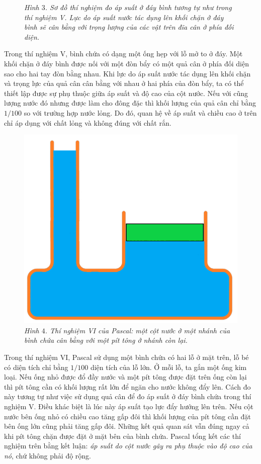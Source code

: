 \begin{multicols}{2}
\begin{figure}[H]
		\caption{\small\textit{\color{timhieukhoahoc}Hình $3$. Sơ đồ thí nghiệm đo áp suất ở đáy bình tương tự như trong thí nghiệm V. Lực do áp suất nước tác dụng lên khối chặn ở đáy bình sẽ cân bằng với trọng lượng của các vật trên đĩa cân ở phía đối diện.}}
		\vspace*{-5pt}
	\end{figure}
	Trong thí nghiệm V, bình chứa có dạng một ống hẹp với lỗ mở to ở đáy. Một khối chặn ở đáy bình được nối với một đòn bẩy có một quả cân ở phía đối diện sao cho hai tay đòn bằng nhau. Khi lực do áp suất nước tác dụng lên khối chặn và trọng lực của quả cân cân bằng với nhau ở hai phía của đòn bẩy, ta có thể thiết lập được sự phụ thuộc giữa áp suất và độ cao của cột nước. Nếu với cũng lượng nước đó nhưng được làm cho đông đặc thì khối lượng của quả cân chỉ bằng $1/100$ so với trường hợp nước lỏng. Do đó, quan hệ về áp suất và chiều cao ở trên chỉ áp dụng với chất lỏng và không đúng với chất rắn.
	\begin{figure}[H]
		\vspace*{-5pt}
		\centering
		\captionsetup{labelformat= empty, justification=centering}
		\includegraphics[width= 0.8\linewidth]{5}
		\caption{\small\textit{\color{timhieukhoahoc}Hình $4$. Thí nghiệm VI của Pascal: một cột nước ở một nhánh của bình chứa cân bằng với một pít tông ở nhánh còn lại.}}
		\vspace*{-10pt}
	\end{figure}
	Trong thí nghiệm VI, Pascal sử dụng một bình chứa có hai lỗ ở mặt trên, lỗ bé có diện tích chỉ bằng $1/100$ diện tích của lỗ lớn. Ở mỗi lỗ, ta gắn một ống kim loại. Nếu ống nhỏ được đổ đầy nước và một pít tông được đặt trên ống còn lại thì pít tông cần có khối lượng rất lớn để ngăn cho nước không đẩy lên. Cách đo này tương tự như việc sử dụng quả cân để đo áp suất ở đáy bình chứa trong thí nghiệm V. Điều khác biệt là lúc này áp suất tạo lực đẩy hướng lên trên. Nếu cột nước bên ống nhỏ có chiều cao tăng gấp đôi thì khối lượng của pít tông cần đặt bên ống lớn cũng phải tăng gấp đôi. Những kết quả quan sát vẫn đúng ngay cả khi pít tông chặn được đặt ở mặt bên của bình chứa. Pascal tổng kết các thí nghiệm trên bằng kết luận: \textit{áp suất do cột nước gây ra phụ thuộc vào độ cao của nó}, chứ không phải độ rộng.

\end{multicols}
